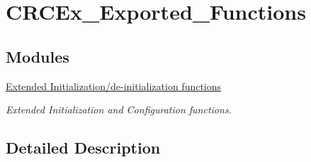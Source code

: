 \hypertarget{group___c_r_c_ex___exported___functions}{}\section{C\+R\+C\+Ex\+\_\+\+Exported\+\_\+\+Functions}
\label{group___c_r_c_ex___exported___functions}
\subsection*{Modules}
\begin{DoxyCompactItemize}
\item 
\hyperlink{group___c_r_c_ex___exported___functions___group1}{Extended Initialization/de-\/initialization functions}
\begin{DoxyCompactList}\small\item\em Extended Initialization and Configuration functions. \end{DoxyCompactList}\end{DoxyCompactItemize}


\subsection{Detailed Description}
